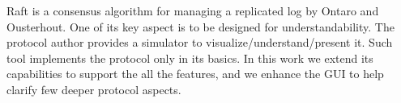 Raft is a consensus algorithm for managing a replicated log by Ontaro and Ousterhout.
One of its key aspect is to be designed for understandability.
The protocol author provides a simulator to visualize/understand/present it.
Such tool implements the protocol only in its basics.
In this work we extend its capabilities to support the all the features,
and we enhance the GUI to help clarify few deeper protocol aspects.
